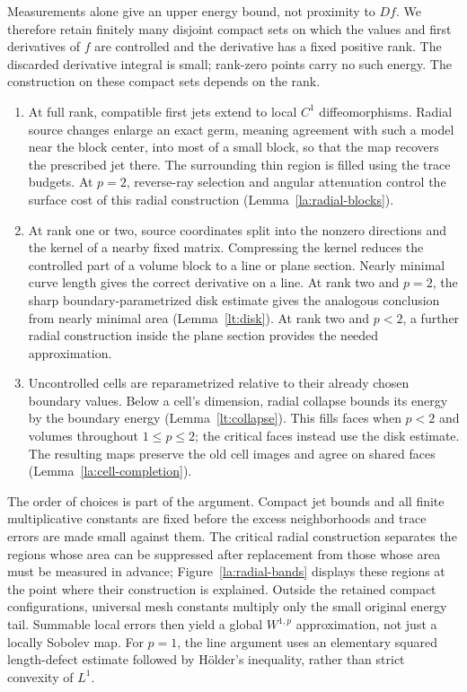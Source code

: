Measurements alone give an upper energy bound, not proximity to
$Df$. We therefore retain finitely many disjoint compact sets on
which the values and first derivatives of $f$ are controlled and
the derivative has a fixed positive rank. The discarded derivative
integral is small; rank-zero points carry no such energy. The
construction on these compact sets depends on the rank.
\begin{enumerate}
\item At full rank, compatible first jets extend to local
$C^1$ diffeomorphisms. Radial source changes enlarge an exact germ,
meaning agreement with such a model near the block center, into most
of a small block, so that the map recovers the prescribed
jet there. The surrounding thin region is filled using the trace
budgets. At $p=2$, reverse-ray selection and angular attenuation
control the surface cost of this radial construction
(Lemma~\ref{la:radial-blocks}).
\item At rank one or two, source coordinates split into the
nonzero directions and the kernel of a nearby fixed matrix.
Compressing the kernel reduces the controlled part of a volume block
to a line or plane section. Nearly minimal curve length gives the
correct derivative on a line. At rank two and $p=2$, the sharp
boundary-parametrized disk estimate gives the analogous conclusion
from nearly minimal area (Lemma~\ref{lt:disk}). At rank two and
$p<2$, a further radial construction inside the plane section
provides the needed approximation.
\item Uncontrolled cells are reparametrized relative to their
already chosen boundary values. Below a cell's dimension, radial
collapse bounds its energy by the boundary energy
(Lemma~\ref{lt:collapse}). This fills faces when $p<2$ and volumes
throughout $1\le p\le2$; the critical faces instead use the disk
estimate. The resulting maps preserve the old cell images and
agree on shared faces (Lemma~\ref{la:cell-completion}).
\end{enumerate}

The order of choices is part of the argument. Compact jet bounds and
all finite multiplicative constants are fixed before the excess
neighborhoods and trace errors are made small against them. The
critical radial construction separates the regions whose area can
be suppressed after replacement from those whose area must be measured
in advance; Figure~\ref{la:radial-bands} displays these regions at the
point where their construction is explained. Outside the
retained compact configurations, universal mesh constants multiply
only the small original energy tail. Summable local errors then
yield a global $W^{1,p}$ approximation, not just a locally Sobolev
map. For $p=1$, the line argument uses an elementary squared
length-defect estimate followed by H\"older's inequality, rather
than strict convexity of $L^1$.

